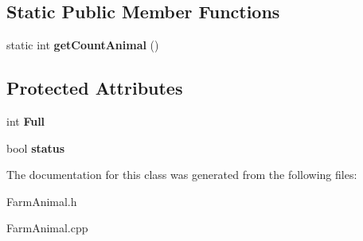 \subsection*{Static Public Member Functions}
\begin{DoxyCompactItemize}
\item 
\mbox{\label{classFarmAnimal_a8430146a93c89ce6f674286a7ccfca18}} 
static int {\bfseries get\+Count\+Animal} ()
\end{DoxyCompactItemize}
\subsection*{Protected Attributes}
\begin{DoxyCompactItemize}
\item 
\mbox{\label{classFarmAnimal_a05002cb10f4fcc02f6723a6a118e65b4}} 
int {\bfseries Full}
\item 
\mbox{\label{classFarmAnimal_a35a7ed9424ab665d03045c3c0bbdfca7}} 
bool {\bfseries status}
\end{DoxyCompactItemize}


The documentation for this class was generated from the following files\+:\begin{DoxyCompactItemize}
\item 
Farm\+Animal.\+h\item 
Farm\+Animal.\+cpp\end{DoxyCompactItemize}
